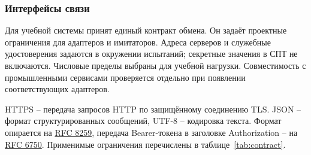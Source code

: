 \documentclass{tpks}
\begin{document}
\subsubsection{Интерфейсы связи}
Для учебной системы принят единый контракт обмена. Он задаёт проектные ограничения для адаптеров и имитаторов. Адреса серверов и служебные удостоверения задаются в окружении испытаний; секретные значения в СПТ не включаются. Числовые пределы выбраны для учебной нагрузки. Совместимость с промышленными сервисами проверяется отдельно при появлении соответствующих адаптеров.

HTTPS -- передача запросов HTTP по защищённому соединению TLS. JSON -- формат структурированных сообщений, UTF-8 -- кодировка текста. Формат опирается на \href{https://www.rfc-editor.org/rfc/rfc8259.html}{RFC 8259}, передача Bearer-токена в заголовке Authorization -- на \href{https://www.rfc-editor.org/rfc/rfc6750.html}{RFC 6750}. Применимые ограничения перечислены в таблице~\ref{tab:contract}.
\end{document}
